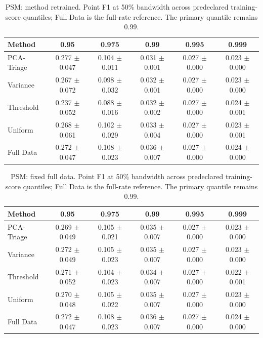 \clearpage
\begin{table}[ht]
\centering
\small
\caption{PSM: method retrained. Point F1 at 50\% bandwidth across predeclared training-score quantiles; Full Data is the full-rate reference. The primary quantile remains 0.99.}
\begin{tabular}{lccccc}
\toprule
Method & 0.95 & 0.975 & 0.99 & 0.995 & 0.999 \\
\midrule
PCA-Triage & 0.277 $\pm$ 0.047 & 0.104 $\pm$ 0.011 & 0.031 $\pm$ 0.001 & 0.027 $\pm$ 0.000 & 0.023 $\pm$ 0.000 \\
Variance & 0.267 $\pm$ 0.072 & 0.098 $\pm$ 0.032 & 0.032 $\pm$ 0.001 & 0.027 $\pm$ 0.000 & 0.023 $\pm$ 0.000 \\
Threshold & 0.237 $\pm$ 0.052 & 0.088 $\pm$ 0.016 & 0.032 $\pm$ 0.002 & 0.027 $\pm$ 0.000 & 0.024 $\pm$ 0.001 \\
Uniform & 0.268 $\pm$ 0.061 & 0.102 $\pm$ 0.029 & 0.033 $\pm$ 0.004 & 0.027 $\pm$ 0.000 & 0.023 $\pm$ 0.001 \\
Full Data & 0.272 $\pm$ 0.047 & 0.108 $\pm$ 0.023 & 0.036 $\pm$ 0.007 & 0.027 $\pm$ 0.000 & 0.024 $\pm$ 0.000 \\
\bottomrule
\end{tabular}
\end{table}
\begin{table}[ht]
\centering
\small
\caption{PSM: fixed full data. Point F1 at 50\% bandwidth across predeclared training-score quantiles; Full Data is the full-rate reference. The primary quantile remains 0.99.}
\begin{tabular}{lccccc}
\toprule
Method & 0.95 & 0.975 & 0.99 & 0.995 & 0.999 \\
\midrule
PCA-Triage & 0.269 $\pm$ 0.049 & 0.105 $\pm$ 0.021 & 0.035 $\pm$ 0.007 & 0.027 $\pm$ 0.000 & 0.023 $\pm$ 0.000 \\
Variance & 0.272 $\pm$ 0.049 & 0.105 $\pm$ 0.023 & 0.035 $\pm$ 0.007 & 0.027 $\pm$ 0.000 & 0.023 $\pm$ 0.000 \\
Threshold & 0.271 $\pm$ 0.052 & 0.104 $\pm$ 0.023 & 0.034 $\pm$ 0.007 & 0.027 $\pm$ 0.000 & 0.022 $\pm$ 0.001 \\
Uniform & 0.270 $\pm$ 0.048 & 0.105 $\pm$ 0.022 & 0.035 $\pm$ 0.007 & 0.027 $\pm$ 0.000 & 0.023 $\pm$ 0.000 \\
Full Data & 0.272 $\pm$ 0.047 & 0.108 $\pm$ 0.023 & 0.036 $\pm$ 0.007 & 0.027 $\pm$ 0.000 & 0.024 $\pm$ 0.000 \\
\bottomrule
\end{tabular}
\end{table}
\clearpage
